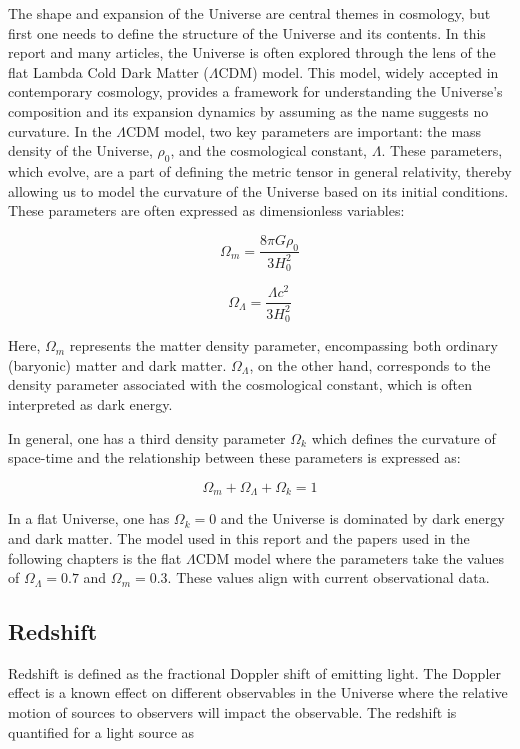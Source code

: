 The shape and expansion of the Universe are central themes in cosmology, but first one needs to define the structure of the Universe and its contents. 
In this report and many articles, the Universe is
often explored through the lens of the flat Lambda Cold Dark Matter ($\Lambda$CDM) model. 
This model, widely accepted in contemporary cosmology, provides a framework for understanding the Universe's composition and its expansion dynamics by assuming as the name suggests no curvature.
In the $\Lambda$CDM model, two key parameters are important: the mass density of the Universe, $\rho_0$, and the cosmological constant, $\Lambda$.
These parameters, which evolve, are a part of defining the metric tensor in general relativity, thereby allowing us to model the curvature of the Universe based on its initial conditions.
These parameters are often expressed as dimensionless variables:

$$
\Omega_m = \frac{8\pi G\rho_0}{3H_0^2}
$$

$$
\Omega_\Lambda = \frac{\Lambda c^2}{3H_0^2}
$$

Here, $\Omega_m$ represents the matter density parameter, encompassing both ordinary (baryonic) matter and dark matter. 
$\Omega_\Lambda$, on the other hand, corresponds to the density parameter associated with the cosmological constant, which is often interpreted as dark energy.




In general, one has a third density parameter $\Omega_k$ which defines the curvature of space-time and the relationship between these parameters is expressed as: 

$$
\Omega_m + \Omega_\Lambda + \Omega_k = 1
$$


In a flat Universe, one has $\Omega_k = 0$ and the Universe is dominated by dark energy and dark matter. The model used in this report and the papers used in the following chapters is the flat $\Lambda$CDM model where the parameters take the values of 
$\Omega_\Lambda = 0.7$ and $\Omega_m = 0.3$. These values align with current observational data.



\subsection{Redshift}
Redshift is defined as the fractional Doppler shift of emitting light. The Doppler effect is a known effect on different observables in the Universe where the relative motion of sources to observers will impact the observable. The redshift is quantified for a light source as 

